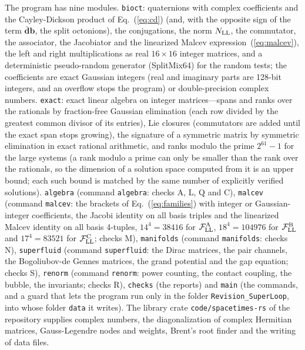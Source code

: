 The program has nine modules. \texttt{bioct}: quaternions with complex coefficients and the
Cayley-Dickson product of Eq.~(\ref{eq:cd}) (and, with the opposite sign of the term $\bar{\mathbf
d}\mathbf b$, the split octonions), the conjugations, the norm $N_{\rm LL}$, the commutator, the
associator, the Jacobiator and the linearized Malcev expression~(\ref{eq:malcev}), the left and right
multiplications as real $16\times16$ integer matrices, and a deterministic pseudo-random generator
(SplitMix64) for the random tests; the coefficients are exact Gaussian integers (real and imaginary
parts are 128-bit integers, and an overflow stops the program) or double-precision complex numbers.
\texttt{exact}: exact linear algebra on integer matrices---spans and ranks over the rationals by
fraction-free Gaussian elimination (each row divided by the greatest common divisor of its entries),
Lie closures (commutators are added until the exact span stops growing), the signature of a symmetric
matrix by symmetric elimination in exact rational arithmetic, and ranks modulo the prime $2^{61}-1$ for
the large systems (a rank modulo a prime can only be smaller than the rank over the rationals, so the
dimension of a solution space computed from it is an upper bound; each such bound is matched by the
same number of explicitly verified solutions). \texttt{algebra} (command \texttt{algebra}: checks A, L,
Q and C), \texttt{malcev} (command \texttt{malcev}: the brackets of Eq.~(\ref{eq:families}) with
integer or Gaussian-integer coefficients, the Jacobi identity on all basis triples and the linearized
Malcev identity on all basis 4-tuples, $14^4=38416$ for $\mathcal F^{\rm A}_{\rm LL}$, $18^4=104976$ for
$\mathcal F^{\rm B}_{\rm LL}$ and $17^4=83521$ for $\mathcal F^{\rm C}_{\rm LL}$; checks M),
\texttt{manifolds} (command \texttt{manifolds}: checks N), \texttt{superfluid} (command
\texttt{superfluid}: the Dirac matrices, the pair channels, the Bogoliubov-de Gennes matrices, the
grand potential and the gap equation; checks S), \texttt{renorm} (command \texttt{renorm}: power
counting, the contact coupling, the bubble, the invariants; checks R), \texttt{checks} (the reports) and
\texttt{main} (the commands, and a guard that lets the program run only in the folder
\texttt{Revision\_SuperLoop}, into whose folder \texttt{data} it writes). The library crate
\texttt{code/spacetimes-rs} of the repository supplies complex numbers, the diagonalization of complex
Hermitian matrices, Gauss-Legendre nodes and weights, Brent's root finder and the writing of data files.

